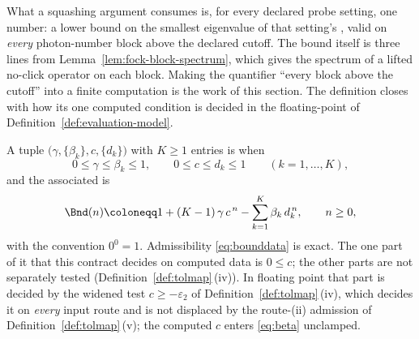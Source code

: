 
What a squashing argument consumes is, for every declared probe setting, one
number: a lower bound on the smallest eigenvalue of that setting's
, valid on \emph{every} photon-number block above the
declared cutoff. The bound itself is three lines from
Lemma~\ref{lem:fock-block-spectrum}, which gives the spectrum of a lifted no-click
operator on each block. Making the quantifier ``every block above the
cutoff'' into a finite computation is the work of this section. The
definition closes with how its one computed condition is decided in the
floating-point  of Definition~\ref{def:evaluation-model}.

\begin{definition}\label{def:bounddata}
A tuple $\big(\gamma,\{\beta_k\},c,\{d_k\}\big)$ with $K\ge1$ entries is
 when
\begin{equation}\label{eq:bounddata}
  0\le\gamma\le\beta_k\le1,\qquad 0\le c\le d_k\le1
  \qquad(k=1,\dots,K),
\end{equation}
and the associated  is
\begin{equation}\label{eq:beta}
  \Bnd(n)\coloneqq 1+(K-1)\,\gamma\,c^{\,n}-\sum_{k=1}^{K}\beta_k\,d_k^{\,n},
  \qquad n\ge0 ,
\end{equation}
with the convention $0^0=1$. Admissibility \eqref{eq:bounddata} is exact. The
one part of it that this contract decides on computed data is $0\le c$; the
other parts are not separately tested (Definition~\ref{def:tolmap}\,(iv)).
In floating point that part is decided by
the widened test $c\ge-\varepsilon_2$ of Definition~\ref{def:tolmap}\,(iv),
which decides it on \emph{every} input route and is not displaced by the
route-(ii) admission of Definition~\ref{def:tolmap}\,(v); the computed $c$
enters \eqref{eq:beta} unclamped.
\end{definition}
